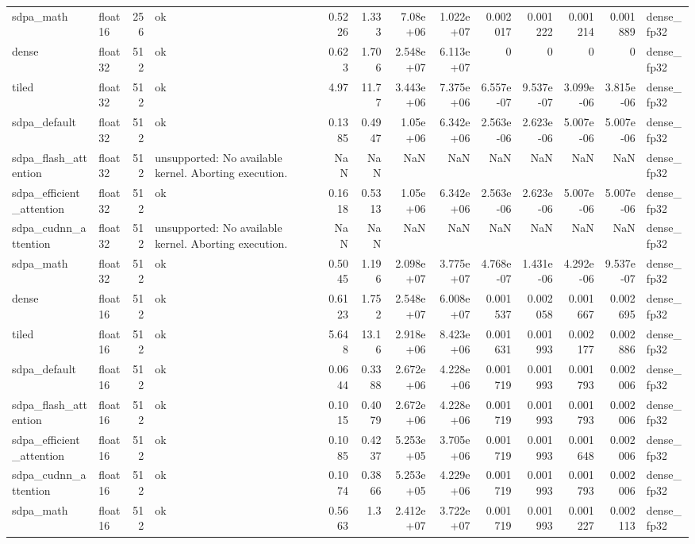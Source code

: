 \begin{table}
\begin{tabular}{llrlrrrrrrrrl}
sdpa\_math & float16 & 256 & ok & 0.5226 & 1.333 & 7.08e+06 & 1.022e+07 & 0.002017 & 0.001222 & 0.001214 & 0.001889 & dense\_fp32 \\
dense & float32 & 512 & ok & 0.623 & 1.706 & 2.548e+07 & 6.113e+07 & 0 & 0 & 0 & 0 & dense\_fp32 \\
tiled & float32 & 512 & ok & 4.97 & 11.77 & 3.443e+06 & 7.375e+06 & 6.557e-07 & 9.537e-07 & 3.099e-06 & 3.815e-06 & dense\_fp32 \\
sdpa\_default & float32 & 512 & ok & 0.1385 & 0.4947 & 1.05e+06 & 6.342e+06 & 2.563e-06 & 2.623e-06 & 5.007e-06 & 5.007e-06 & dense\_fp32 \\
sdpa\_flash\_attention & float32 & 512 & unsupported: No available kernel. Aborting execution. & NaN & NaN & NaN & NaN & NaN & NaN & NaN & NaN & dense\_fp32 \\
sdpa\_efficient\_attention & float32 & 512 & ok & 0.1618 & 0.5313 & 1.05e+06 & 6.342e+06 & 2.563e-06 & 2.623e-06 & 5.007e-06 & 5.007e-06 & dense\_fp32 \\
sdpa\_cudnn\_attention & float32 & 512 & unsupported: No available kernel. Aborting execution. & NaN & NaN & NaN & NaN & NaN & NaN & NaN & NaN & dense\_fp32 \\
sdpa\_math & float32 & 512 & ok & 0.5045 & 1.196 & 2.098e+07 & 3.775e+07 & 4.768e-07 & 1.431e-06 & 4.292e-06 & 9.537e-07 & dense\_fp32 \\
dense & float16 & 512 & ok & 0.6123 & 1.752 & 2.548e+07 & 6.008e+07 & 0.001537 & 0.002058 & 0.001667 & 0.002695 & dense\_fp32 \\
tiled & float16 & 512 & ok & 5.648 & 13.16 & 2.918e+06 & 8.423e+06 & 0.001631 & 0.001993 & 0.002177 & 0.002886 & dense\_fp32 \\
sdpa\_default & float16 & 512 & ok & 0.0644 & 0.3388 & 2.672e+06 & 4.228e+06 & 0.001719 & 0.001993 & 0.001793 & 0.002006 & dense\_fp32 \\
sdpa\_flash\_attention & float16 & 512 & ok & 0.1015 & 0.4079 & 2.672e+06 & 4.228e+06 & 0.001719 & 0.001993 & 0.001793 & 0.002006 & dense\_fp32 \\
sdpa\_efficient\_attention & float16 & 512 & ok & 0.1085 & 0.4237 & 5.253e+05 & 3.705e+06 & 0.001719 & 0.001993 & 0.001648 & 0.002006 & dense\_fp32 \\
sdpa\_cudnn\_attention & float16 & 512 & ok & 0.1074 & 0.3866 & 5.253e+05 & 4.229e+06 & 0.001719 & 0.001993 & 0.001793 & 0.002006 & dense\_fp32 \\
sdpa\_math & float16 & 512 & ok & 0.5663 & 1.3 & 2.412e+07 & 3.722e+07 & 0.001719 & 0.001993 & 0.001227 & 0.002113 & dense\_fp32 \\

\end{tabular}
\end{table}

